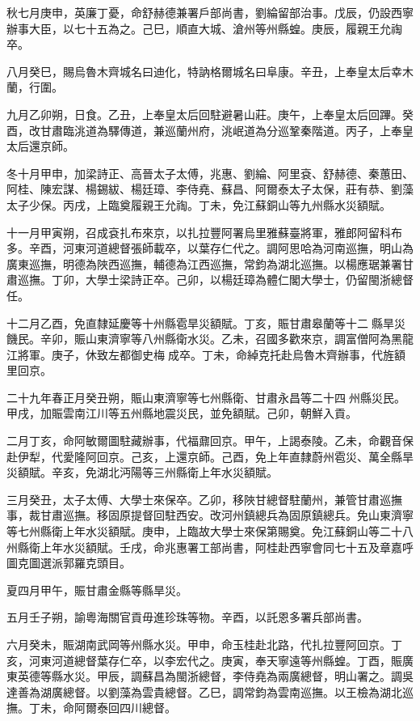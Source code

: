 \begin{pinyinscope}
秋七月庚申，英廉丁憂，命舒赫德兼署戶部尚書，劉綸留部治事。戊辰，仍設西寧辦事大臣，以七十五為之。己巳，順直大城、滄州等州縣蝗。庚辰，履親王允祹卒。

八月癸巳，賜烏魯木齊城名曰迪化，特訥格爾城名曰阜康。辛丑，上奉皇太后幸木蘭，行圍。

九月乙卯朔，日食。乙丑，上奉皇太后回駐避暑山莊。庚午，上奉皇太后回蹕。癸酉，改甘肅臨洮道為驛傳道，兼巡蘭州府，洮岷道為分巡鞏秦階道。丙子，上奉皇太后還京師。

冬十月甲申，加梁詩正、高晉太子太傅，兆惠、劉綸、阿里袞、舒赫德、秦蕙田、阿桂、陳宏謀、楊錫紱、楊廷璋、李侍堯、蘇昌、阿爾泰太子太保，莊有恭、劉藻太子少保。丙戌，上臨奠履親王允祹。丁未，免江蘇銅山等九州縣水災額賦。

十一月甲寅朔，召成袞扎布來京，以扎拉豐阿署烏里雅蘇臺將軍，雅郎阿留科布多。辛酉，河東河道總督張師載卒，以葉存仁代之。調阿思哈為河南巡撫，明山為廣東巡撫，明德為陜西巡撫，輔德為江西巡撫，常鈞為湖北巡撫。以楊應琚兼署甘肅巡撫。丁卯，大學士梁詩正卒。己卯，以楊廷璋為體仁閣大學士，仍留閩浙總督任。

十二月乙酉，免直隸延慶等十州縣雹旱災額賦。丁亥，賑甘肅皋蘭等十二縣旱災饑民。辛卯，賑山東濟寧等八州縣衛水災。乙未，召國多歡來京，調富僧阿為黑龍江將軍。庚子，休致左都御史梅成卒。丁未，命綽克托赴烏魯木齊辦事，代旌額里回京。

二十九年春正月癸丑朔，賑山東濟寧等七州縣衛、甘肅永昌等二十四州縣災民。甲戌，加賑雲南江川等五州縣地震災民，並免額賦。己卯，朝鮮入貢。

二月丁亥，命阿敏爾圖駐藏辦事，代福鼐回京。甲午，上謁泰陵。乙未，命觀音保赴伊犁，代愛隆阿回京。己亥，上還京師。己酉，免上年直隸蔚州雹災、萬全縣旱災額賦。辛亥，免湖北沔陽等三州縣衛上年水災額賦。

三月癸丑，太子太傅、大學士來保卒。乙卯，移陜甘總督駐蘭州，兼管甘肅巡撫事，裁甘肅巡撫。移固原提督回駐西安。改河州鎮總兵為固原鎮總兵。免山東濟寧等七州縣衛上年水災額賦。庚申，上臨故大學士來保第賜奠。免江蘇銅山等二十八州縣衛上年水災額賦。壬戌，命兆惠署工部尚書，阿桂赴西寧會同七十五及章嘉呼圖克圖選派郭羅克頭目。

夏四月甲午，賑甘肅金縣等縣旱災。

五月壬子朔，諭粵海關官貢毋進珍珠等物。辛酉，以託恩多署兵部尚書。

六月癸未，賑湖南武岡等州縣水災。甲申，命玉桂赴北路，代扎拉豐阿回京。丁亥，河東河道總督葉存仁卒，以李宏代之。庚寅，奉天寧遠等州縣蝗。丁酉，賑廣東英德等縣水災。甲辰，調蘇昌為閩浙總督，李侍堯為兩廣總督，明山署之。調吳達善為湖廣總督。以劉藻為雲貴總督。乙巳，調常鈞為雲南巡撫。以王檢為湖北巡撫。丁未，命阿爾泰回四川總督。


\end{pinyinscope}
